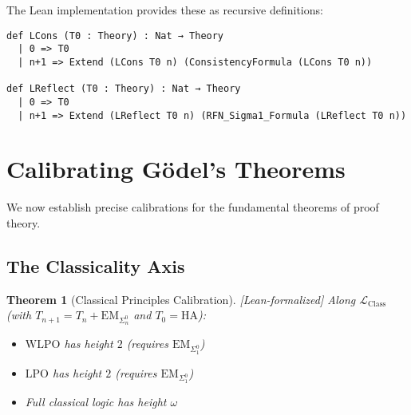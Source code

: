 \documentclass[11pt]{article}
\newtheorem{theorem}{Theorem}[section]
\newcommand{\HA}{\mathrm{HA}}
\newcommand{\LClass}{\mathcal{L}_{\mathrm{Class}}}
\newcommand{\EM}{\mathrm{EM}}
\newcommand{\LPO}{\mathrm{LPO}}
\newcommand{\WLPO}{\mathrm{WLPO}}
\newcommand{\leanok}{\textsf{\textcolor{green!70!black}{[Lean-formalized]}}}
\begin{document}
The Lean implementation provides these as recursive definitions:
\begin{lstlisting}[language=Lean]
def LCons (T0 : Theory) : Nat → Theory
  | 0 => T0
  | n+1 => Extend (LCons T0 n) (ConsistencyFormula (LCons T0 n))

def LReflect (T0 : Theory) : Nat → Theory  
  | 0 => T0
  | n+1 => Extend (LReflect T0 n) (RFN_Sigma1_Formula (LReflect T0 n))
\end{lstlisting}

\section{Calibrating Gödel's Theorems}

We now establish precise calibrations for the fundamental theorems of proof theory.

\subsection{The Classicality Axis}

\begin{theorem}[Classical Principles Calibration] \leanok
Along $\LClass$ (with $T_{n+1}=T_n+\EM_{\Sigma^0_n}$ and $T_0=\HA$):
\begin{itemize}
\item $\WLPO$ has height $2$ (requires $\EM_{\Sigma^0_1}$)
\item $\LPO$ has height $2$ (requires $\EM_{\Sigma^0_1}$)
\item Full classical logic has height $\omega$
\end{itemize}
\end{theorem}
\end{document}
